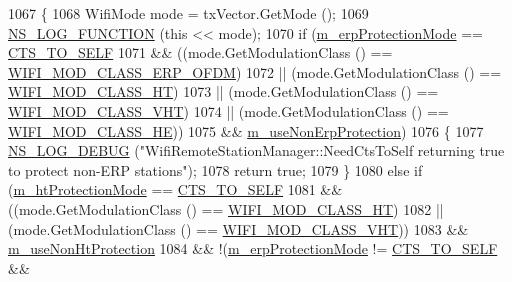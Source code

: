 \begin{DoxyCode}
1067 \{
1068   WifiMode mode = txVector.GetMode ();
1069   \hyperlink{log-macros-disabled_8h_a90b90d5bad1f39cb1b64923ea94c0761}{NS\_LOG\_FUNCTION} (\textcolor{keyword}{this} << mode);
1070   \textcolor{keywordflow}{if} (\hyperlink{classns3_1_1WifiRemoteStationManager_acc0e4f606a7226059ff0e2e7c74024bc}{m\_erpProtectionMode} == \hyperlink{classns3_1_1WifiRemoteStationManager_acd7d97851233efb176637f24b3f8abd6ad0c522321faed61b29adaf6638237a13}{CTS\_TO\_SELF}
1071       && ((mode.GetModulationClass () == \hyperlink{namespacens3_aa999e1221606a2b21b1eb33c2007c217afc1f5ef8d2c985f37a3224dd86ab014d}{WIFI\_MOD\_CLASS\_ERP\_OFDM})
1072           || (mode.GetModulationClass () == \hyperlink{namespacens3_aa999e1221606a2b21b1eb33c2007c217a6ac45cac36cc4454649435d24ebf349c}{WIFI\_MOD\_CLASS\_HT})
1073           || (mode.GetModulationClass () == \hyperlink{namespacens3_aa999e1221606a2b21b1eb33c2007c217a9863e4342bf5c238c74dddfc4d96c67e}{WIFI\_MOD\_CLASS\_VHT})
1074           || (mode.GetModulationClass () == \hyperlink{namespacens3_aa999e1221606a2b21b1eb33c2007c217abfa4f7272510045a9b43e8ac27ac13b0}{WIFI\_MOD\_CLASS\_HE}))
1075       && \hyperlink{classns3_1_1WifiRemoteStationManager_af5192c20c737ca1b2f054914272c89f4}{m\_useNonErpProtection})
1076     \{
1077       \hyperlink{group__logging_ga413f1886406d49f59a6a0a89b77b4d0a}{NS\_LOG\_DEBUG} (\textcolor{stringliteral}{"WifiRemoteStationManager::NeedCtsToSelf returning true to protect non-ERP
       stations"});
1078       \textcolor{keywordflow}{return} \textcolor{keyword}{true};
1079     \}
1080   \textcolor{keywordflow}{else} \textcolor{keywordflow}{if} (\hyperlink{classns3_1_1WifiRemoteStationManager_a1a4afefd1dd2f335ef6b44c3619073cd}{m\_htProtectionMode} == \hyperlink{classns3_1_1WifiRemoteStationManager_acd7d97851233efb176637f24b3f8abd6ad0c522321faed61b29adaf6638237a13}{CTS\_TO\_SELF}
1081            && ((mode.GetModulationClass () == \hyperlink{namespacens3_aa999e1221606a2b21b1eb33c2007c217a6ac45cac36cc4454649435d24ebf349c}{WIFI\_MOD\_CLASS\_HT})
1082                || (mode.GetModulationClass () == \hyperlink{namespacens3_aa999e1221606a2b21b1eb33c2007c217a9863e4342bf5c238c74dddfc4d96c67e}{WIFI\_MOD\_CLASS\_VHT}))
1083            && \hyperlink{classns3_1_1WifiRemoteStationManager_a4205e24475f15413af70fb8225044525}{m\_useNonHtProtection}
1084            && !(\hyperlink{classns3_1_1WifiRemoteStationManager_acc0e4f606a7226059ff0e2e7c74024bc}{m\_erpProtectionMode} != \hyperlink{classns3_1_1WifiRemoteStationManager_acd7d97851233efb176637f24b3f8abd6ad0c522321faed61b29adaf6638237a13}{CTS\_TO\_SELF} && 

\end{DoxyCode}

